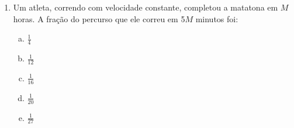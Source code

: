 \documentclass[a4paper,14pt]{article}
\begin{document}
\begin{multicols}{2}
\begin{enumerate}
\begin{enumerate}[a)]
            	\item R\$ 1.945,00
            	\item R\$ 2.534,00
            	\item R\$ 4.113,00
            	\item R\$ 2.106,00
            	\item R\$ 3.945,00 \\\\\\\\\\\\\\\\\\\\\\\\\\\\\\\\\\\\\\\\\\\\\\\\\\\\\\\\
            \end{enumerate}	
        	\item Um atleta, correndo com velocidade constante, completou a matatona em $M$ horas. A fração do percurso que ele correu em 5$M$ minutos foi:
        	\begin{enumerate}[a)]
        		\item $\frac{1}{4}$
        		\item $\frac{1}{12}$
        		\item $\frac{1}{16}$
        		\item $\frac{1}{20}$
        		\item $\frac{1}{27}$
        	\end{enumerate}
   	    \end{enumerate}

\end{multicols}
\end{document}
